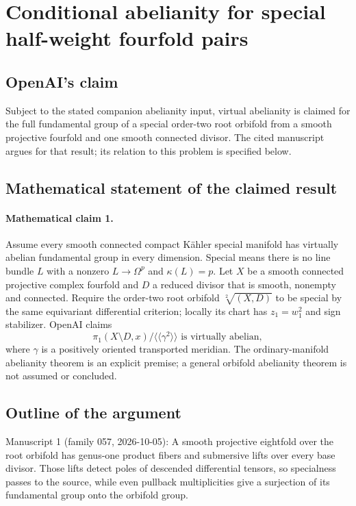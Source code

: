 \documentclass[11pt]{article}
\begin{document}
\section*{Conditional abelianity for special half-weight fourfold pairs}

\subsection{OpenAI's claim}
Subject to the stated companion abelianity input, virtual abelianity is claimed for the full fundamental group of a special order-two root orbifold from a smooth projective fourfold and one smooth connected divisor. The cited manuscript argues for that result; its relation to this problem is specified below.

\subsection{Mathematical statement of the claimed result}
\paragraph{Mathematical claim 1.} Assume every smooth connected compact Kähler special manifold has virtually abelian fundamental group in every dimension. Special means there is no line bundle $L$ with a nonzero $L\to\Omega^p$ and $\kappa(L)=p$. Let $X$ be a smooth connected projective complex fourfold and $D$ a reduced divisor that is smooth, nonempty and connected. Require the order-two root orbifold $\sqrt[2]{(X,D)}$ to be special by the same equivariant differential criterion; locally its chart has $z_1=w_1^2$ and sign stabilizer. OpenAI claims
\[
\pi_1(X\setminus D,x)/\langle\!\langle\gamma^2\rangle\!\rangle\text{ is virtually abelian},
\]
where $\gamma$ is a positively oriented transported meridian. The ordinary-manifold abelianity theorem is an explicit premise; a general orbifold abelianity theorem is not assumed or concluded.

\subsection{Outline of the argument}
Manuscript 1 (family 057, 2026-10-05): A smooth projective eightfold over the root orbifold has genus-one product fibers and submersive lifts over every base divisor. Those lifts detect poles of descended differential tensors, so specialness passes to the source, while even pullback multiplicities give a surjection of its fundamental group onto the orbifold group.
\end{document}

